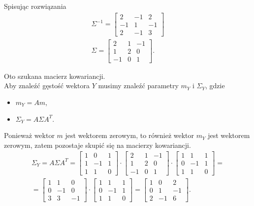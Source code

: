 Spisując rozwiązania
\begin{gather*}
\Sigma^{-1}=
\begin{bmatrix}
	2  & -1 & 2  \\
	-1 & 1  & -1 \\
	2  & -1 & 3
\end{bmatrix}\\
\Sigma=
\begin{bmatrix}
	2  & 1 & -1 \\
	1  & 2 & 0  \\
	-1 & 0 & 1
\end{bmatrix}.
\end{gather*}

Oto szukana macierz kowariancji.\\
Aby znaleźć gęstość wektora $ Y $ musimy znaleźć parametry $ m_Y $ i $ \Sigma_Y $, gdzie
\begin{itemize}
\item $ m_Y=Am $,
\item $ \Sigma_Y=A\Sigma A^T $.
\end{itemize}
Ponieważ wektor $ m $ jest wektorem zerowym, to również wektor $ m_Y $ jest wektorem zerowym, zatem pozostaje skupić się na macierzy kowariancji.
\begin{gather*}
\Sigma_Y=A\Sigma A^T=
\begin{bmatrix}
	1 & 0  & 1 \\
	1 & -1 & 1 \\
	1 & 1  & 0
\end{bmatrix}\cdot
\begin{bmatrix}
	2  & 1 & -1 \\
	1  & 2 & 0  \\
	-1 & 0 & 1
\end{bmatrix}\cdot
\begin{bmatrix}
	1 & 1  & 1 \\
	0 & -1 & 1 \\
	1 & 1  & 0
\end{bmatrix}
=\\=
\begin{bmatrix}
	1 & 1  & 0  \\
	0 & -1 & 0  \\
	3 & 3  & -1
\end{bmatrix}\cdot
\begin{bmatrix}
	1 & 1  & 1 \\
	0 & -1 & 1 \\
	1 & 1  & 0
\end{bmatrix}=
\begin{bmatrix}
	1 & 0  & 2  \\
	0 & 1  & -1 \\
	2 & -1 & 6
\end{bmatrix}.
\end{gather*}
